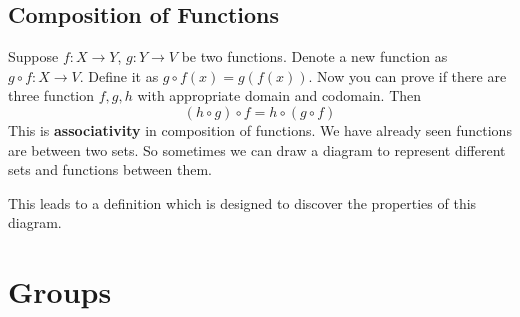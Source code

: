 \documentclass{article}
\begin{document}
\subsection{Composition of Functions}
Suppose $f : X \rightarrow Y$, $g : Y \rightarrow V$ be two functions. Denote a new function as $g \circ f : X \rightarrow V$. Define it as
$g \circ f (x) = g(f(x))$. Now you can prove if there are three function $f, g, h$ with appropriate domain and codomain. Then
$$
(h \circ g) \circ f = h \circ (g \circ f)
$$
This is \textbf{associativity} in composition of functions. We have already seen functions are between two sets. So sometimes we can draw a diagram to 
represent different sets and functions between them.
\begin{center}
    
\end{center}
This leads to a definition which is designed to discover the properties of this diagram.
\section{Groups}
\end{document}
